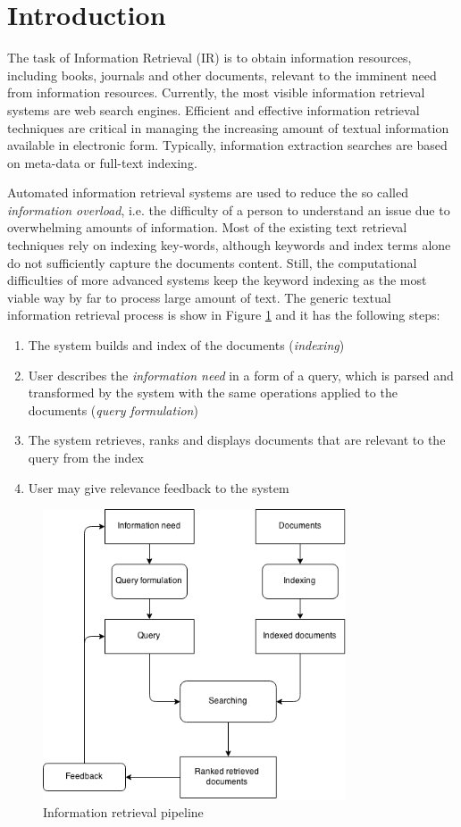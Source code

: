 \section{Introduction}

The task of Information Retrieval (IR) is to obtain information resources, including books, journals and other documents, relevant to the imminent need from information resources. Currently, the most visible information retrieval systems are web search engines. Efficient and effective information retrieval techniques are critical in managing the increasing amount of textual information available in electronic form. Typically, information extraction searches are based on meta-data or full-text indexing.

Automated information retrieval systems are used to reduce the so called \textit{information overload}, i.e. the difficulty of a person to understand an issue due to overwhelming amounts of information. Most of the existing text retrieval techniques rely on indexing key-words, although keywords and index terms alone do not sufficiently capture the documents content. Still, the computational difficulties of more advanced systems keep the keyword indexing as the most viable way by far to process large amount of text. 
The generic textual information retrieval process is show in Figure \ref{fig:IR} and it has the following steps:
\begin{enumerate}
  \item The system builds and index of the documents (\textit{indexing}) 
  \item User describes the \textit{information need} in a form of a query, which is parsed and transformed by the system with the same operations applied to the documents (\textit{query formulation})
  \item The system retrieves, ranks and displays documents that are relevant to the query from the index
  \item User may give relevance feedback to the system
\end{enumerate}
\begin{figure}[ht]
	\centering
	\includegraphics[width=0.8\textwidth]{IR.png}
	\caption{Information retrieval pipeline \citep{hiemstra2009information}}
	\label{fig:IR}
\end{figure}
